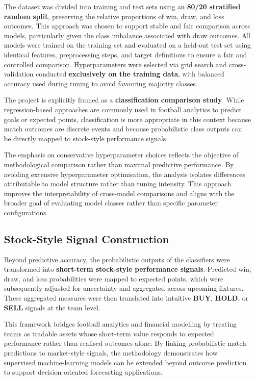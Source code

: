 \documentclass[11pt,a4paper]{article}
\begin{document}
The dataset was divided into training and test sets using an \textbf{80/20 stratified random split}, preserving the relative proportions of win, draw, and loss outcomes. This approach was chosen to support stable and fair comparison across models, particularly given the class imbalance associated with draw outcomes. All models were trained on the training set and evaluated on a held-out test set using identical features, preprocessing steps, and target definitions to ensure a fair and controlled comparison. Hyperparameters were selected via grid search and cross-validation conducted \textbf{exclusively on the training data}, with balanced accuracy used during tuning to avoid favouring majority classes.

The project is explicitly framed as a \textbf{classification comparison study}. While regression-based approaches are commonly used in football analytics to predict goals or expected points, classification is more appropriate in this context because match outcomes are discrete events and because probabilistic class outputs can be directly mapped to stock-style performance signals.

The emphasis on conservative hyperparameter choices reflects the objective of methodological comparison rather than maximal predictive performance. By avoiding extensive hyperparameter optimisation, the analysis isolates differences attributable to model structure rather than tuning intensity. This approach improves the interpretability of cross-model comparisons and aligns with the broader goal of evaluating model classes rather than specific parameter configurations.


\subsection{Stock-Style Signal Construction}

Beyond predictive accuracy, the probabilistic outputs of the classifiers were transformed into \textbf{short-term stock-style performance signals}. Predicted win, draw, and loss probabilities were mapped to expected points, which were subsequently adjusted for uncertainty and aggregated across upcoming fixtures. These aggregated measures were then translated into intuitive \textbf{BUY}, \textbf{HOLD}, or \textbf{SELL} signals at the team level.

This framework bridges football analytics and financial modelling by treating teams as tradable assets whose short-term value responds to expected performance rather than realised outcomes alone. By linking probabilistic match predictions to market-style signals, the methodology demonstrates how supervised machine-learning models can be extended beyond outcome prediction to support decision-oriented forecasting applications.
\end{document}
